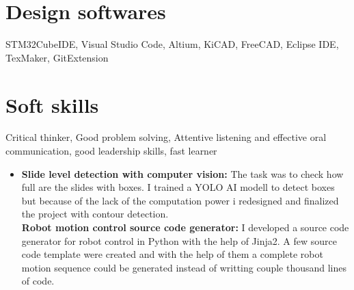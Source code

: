 \documentclass[11pt,oneslide,a4paper,titlepage]{article}
\begin{document}
\newpage
{}
\begin{tcolorbox}
	\begin{minipage}[t]{8cm}
		\vspace*{-0.5cm}
		\begin{tcolorbox}[grow to left by=0.6cm,colback=gray!25,colframe=white]
			\vspace*{0.5cm}
			\section*{Design softwares}
			\hfill\break
			STM32CubeIDE, Visual Studio Code, Altium, KiCAD, FreeCAD, 					Eclipse IDE, TexMaker, GitExtension	
			\section*{Soft skills}
		    Critical thinker, Good problem solving, Attentive listening and effective oral communication, good leadership skills, fast learner				
		\end{tcolorbox}
	\end{minipage}
	\begin{minipage}[t]{11cm}
		\vspace*{0.5cm}
		\begin{tcolorbox}[grow to right by=0.75cm,colframe=white,colback=white]
			\begin{itemize}
			\item[]{
				\textbf{Slide level detection with computer vision:} The task was to check how full are the slides with boxes. I trained a YOLO AI modell to detect boxes but because of the lack of the computation power i redesigned and finalized the project with contour detection. \\ 

				\textbf{Robot motion control source code generator:}
I developed a source code generator for robot control in Python with the help of Jinja2.
A few source code template were created and with the help of them a complete robot motion sequence could be generated instead of writting couple thousand lines of code.
			}
			\end{itemize}
			

\end{tcolorbox}
\end{minipage}
\end{tcolorbox}
\end{document}
